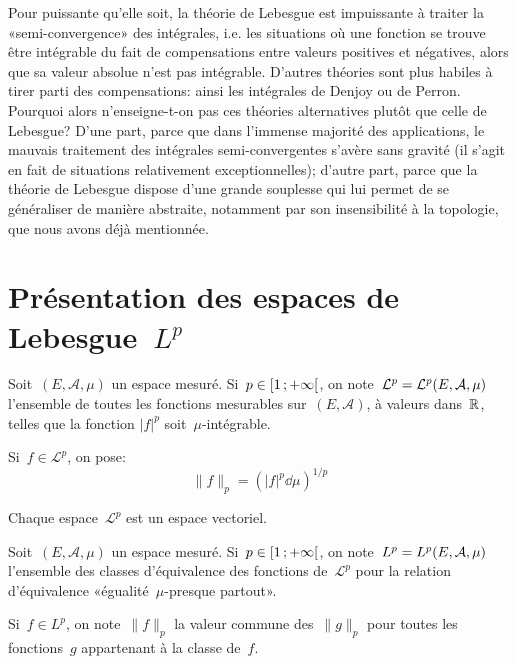 \begin{histoire}
\medskip
Pour puissante qu'elle soit, la théorie de Lebesgue est impuissante à traiter la «semi-convergence» des intégrales, i.e. les situations où une fonction se trouve être intégrable du fait de compensations entre valeurs positives et négatives, alors que sa valeur absolue n'est pas intégrable. D'autres théories sont plus habiles à tirer parti des compensations: ainsi les intégrales de Denjoy ou de Perron.
Pourquoi alors n'enseigne-t-on pas ces théories alternatives plutôt que celle de Lebesgue? D'une part, parce que dans l'immense majorité des applications, le mauvais traitement des intégrales semi-convergentes s'avère sans gravité (il s'agit en fait de situations relativement exceptionnelles); d'autre part, parce que la théorie de Lebesgue dispose d'une grande souplesse qui lui permet de se généraliser de manière abstraite, notamment par son insensibilité à la topologie, que nous avons déjà mentionnée.


\end{histoire}

\medskip{}
\section{Présentation des espaces de Lebesgue~$L^p$}

\begin{definition}
Soit~$(E,\mathcal{A},\mu)$ un espace mesuré.
Si~$\colorred p\in\intfo{1}{+\infty}$, on note~$\colorblue \mathcal{L}^p=\mathcal{L}^p(E,\mathcal{A},\mu)$ l'ensemble de toutes
les fonctions mesurables sur~$(E,\mathcal{A})$, à valeurs dans~$\mathbb R$, telles que la fonction
$|f|^p$ soit~$\mu$-intégrable.

Si~$f\in\mathcal{L}^p$, on pose:
\begin{equation}\|f\|_p=\left(|f|^p\dd\mu\right)^{1/p} \end{equation}
\end{definition}

\begin{theoreme}
Chaque espace~$\mathcal{L}^p$ est un espace vectoriel.
\end{theoreme}

\begin{definition}[Espace~$L^p$]
Soit~$(E,\mathcal{A},\mu)$ un espace mesuré.
Si~$\colorred p\in\intfo{1}{+\infty}$, on note~$\colorblue L^p=L^p(E,\mathcal{A},\mu)$ l'ensemble des
classes d'équivalence des fonctions de~$\mathcal{L}^p$ pour la relation d'équivalence
«égualité~$\mu$-presque partout».

Si~$f\in L^p$, on note~$\|f\|_p$ la valeur commune des~$\| g\| _p$ pour toutes les fonctions~$g$
appartenant à la classe de~$f$.
\end{definition}

